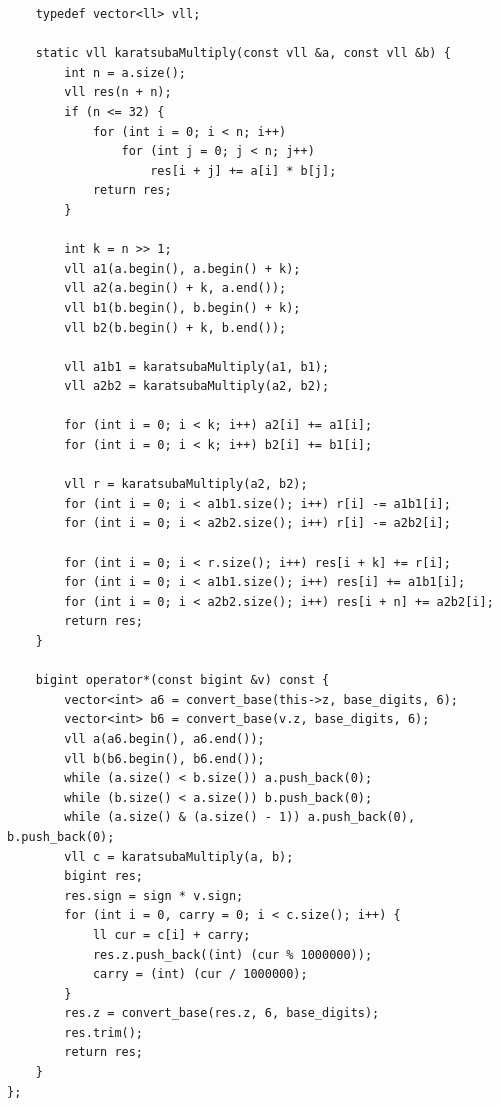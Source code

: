\documentclass[twoside]{article}
\begin{document}
\begin{lstlisting}
    typedef vector<ll> vll;

    static vll karatsubaMultiply(const vll &a, const vll &b) {
        int n = a.size();
        vll res(n + n);
        if (n <= 32) {
            for (int i = 0; i < n; i++)
                for (int j = 0; j < n; j++)
                    res[i + j] += a[i] * b[j];
            return res;
        }

        int k = n >> 1;
        vll a1(a.begin(), a.begin() + k);
        vll a2(a.begin() + k, a.end());
        vll b1(b.begin(), b.begin() + k);
        vll b2(b.begin() + k, b.end());

        vll a1b1 = karatsubaMultiply(a1, b1);
        vll a2b2 = karatsubaMultiply(a2, b2);

        for (int i = 0; i < k; i++) a2[i] += a1[i];
        for (int i = 0; i < k; i++) b2[i] += b1[i];

        vll r = karatsubaMultiply(a2, b2);
        for (int i = 0; i < a1b1.size(); i++) r[i] -= a1b1[i];
        for (int i = 0; i < a2b2.size(); i++) r[i] -= a2b2[i];

        for (int i = 0; i < r.size(); i++) res[i + k] += r[i];
        for (int i = 0; i < a1b1.size(); i++) res[i] += a1b1[i];
        for (int i = 0; i < a2b2.size(); i++) res[i + n] += a2b2[i];
        return res;
    }

    bigint operator*(const bigint &v) const {
        vector<int> a6 = convert_base(this->z, base_digits, 6);
        vector<int> b6 = convert_base(v.z, base_digits, 6);
        vll a(a6.begin(), a6.end());
        vll b(b6.begin(), b6.end());
        while (a.size() < b.size()) a.push_back(0);
        while (b.size() < a.size()) b.push_back(0);
        while (a.size() & (a.size() - 1)) a.push_back(0), b.push_back(0);
        vll c = karatsubaMultiply(a, b);
        bigint res;
        res.sign = sign * v.sign;
        for (int i = 0, carry = 0; i < c.size(); i++) {
            ll cur = c[i] + carry;
            res.z.push_back((int) (cur % 1000000));
            carry = (int) (cur / 1000000);
        }
        res.z = convert_base(res.z, 6, base_digits);
        res.trim();
        return res;
    }
};
\end{lstlisting}
\end{document}
